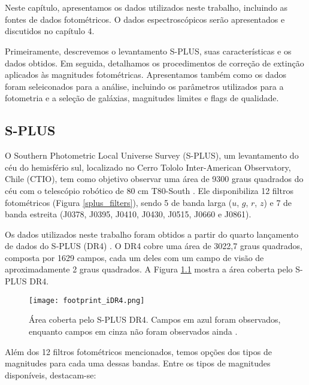 \chapter{\chapternamedatabase}\label{database}

Neste capítulo, apresentamos os dados utilizados neste trabalho, incluindo as fontes de dados fotométricos. O dados espectroscópicos serão apresentados e discutidos no capítulo 4. 

Primeiramente, descrevemos o levantamento S-PLUS, suas características e os dados obtidos. Em seguida, detalhamos os procedimentos de correção de extinção aplicados às magnitudes fotométricas. Apresentamos também como os dados foram seleiconados para a análise, incluindo os parâmetros utilizados para a fotometria e a seleção de galáxias, magnitudes limites e flags de qualidade.

\section{S-PLUS}
O Southern Photometric Local Universe Survey (S-PLUS), um levantamento do céu do hemisfério sul, localizado no Cerro Tololo Inter-American Observatory, Chile (CTIO), tem como objetivo observar uma área de 9300 graus quadrados do céu com o telescópio robótico de 80 cm T80-South \citep{oliveira2019splus}. Ele disponibiliza 12 filtros fotométricos (Figura \ref{splus_filters}), sendo 5 de banda larga ($u$, $g$, $r$, $z$) e 7 de banda estreita (J0378, J0395, J0410, J0430, J0515, J0660 e J0861).

Os dados utilizados neste trabalho foram obtidos a partir do quarto lançamento de dados do S-PLUS (DR4) \citep{herpich2024fourthsplusdatarelease}. O DR4 cobre uma área de 3022,7 graus quadrados, composta por 1629 campos, cada um deles com um campo de visão de aproximadamente 2 graus quadrados. A Figura \ref{footprint_iDR4} mostra a área coberta pelo S-PLUS DR4.

\begin{figure}[!ht]
    \begin{center}
    \texttt{[image: footprint\_iDR4.png]}
    \caption[]{Área coberta pelo S-PLUS DR4. Campos em azul foram observados, enquanto campos em cinza não foram observados ainda \cite{splus_DR4_footprint}.}
    \label{footprint_iDR4}
    \end{center}
\end{figure}

Além dos 12 filtros fotométricos mencionados, temos opções dos tipos de magnitudes para cada uma dessas bandas. Entre os tipos de magnitudes disponíveis, destacam-se:


